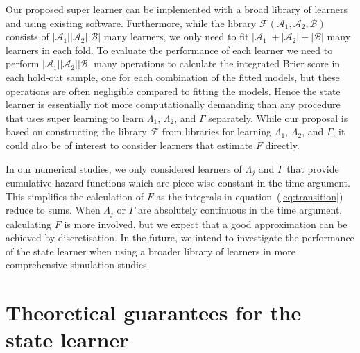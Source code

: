 \documentclass{statsoc}
\newcommand{\1}{\mathds{1}}
\begin{document}
Our proposed super learner can be implemented with a broad library of learners
and using existing software.
Furthermore, while
the library \( \mathcal{F}(\mathcal{A}_1,\mathcal{A}_2,\mathcal{B}) \) consists
of \( |\mathcal{A}_1||\mathcal{A}_2||\mathcal{B}| \) many learners, we only need to fit
\( |\mathcal{A}_1| +|\mathcal{A}_2| + |\mathcal{B}| \) many learners in each fold. To
evaluate the performance of each learner we need to perform
\( |\mathcal{A}_1||\mathcal{A}_2||\mathcal{B}| \) many operations to calculate the
integrated Brier score in each hold-out sample, one for each combination of the
fitted models, but these operations are often negligible compared to fitting the
models. Hence the state learner is essentially not more computationally demanding
than any procedure that uses super learning to learn $\Lambda_1$, $\Lambda_2$,
and $\Gamma$ separately. While our proposal is based on constructing the library
\( \mathcal{F} \) from libraries for learning \( \Lambda_1 \), $\Lambda_2$, and
$\Gamma$, it could also be of interest to consider learners that estimate
\( F \) directly.
%

In our numerical studies, we only considered learners of $\Lambda_j$ and
$\Gamma$ that provide cumulative hazard functions which are piece-wise constant
in the time argument. This simplifies the calculation of \( F \) as the
integrals in equation~(\ref{eq:transition}) reduce to sums. When $\Lambda_j$ or
\( \Gamma \) are absolutely continuous in the time argument, calculating \( F \)
is more involved, but we expect that a good approximation can be achieved by
discretisation. In the future, we intend to investigate the performance of the
state learner when using a broader library of learners in more comprehensive
simulation studies.



\appendix

\section{Theoretical guarantees for the state learner}
\label{sec:proof-proposition}
\end{document}
